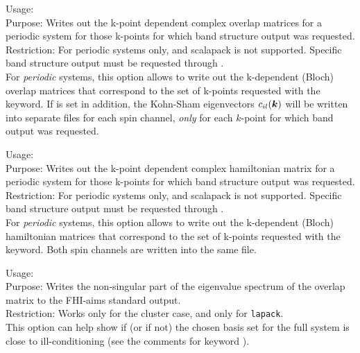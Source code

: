 {
  \noindent
  Usage:   \\[1.0ex]
  Purpose: Writes out the k-point dependent complex overlap matrices 
    for a periodic system for those k-points for which band structure 
    output was requested. \\[1.0ex]
  Restriction: For periodic systems only, and scalapack is not
  supported. Specific band structure output must be requested through 
   . \\[1.0ex]
}
For \emph{periodic} systems, this option allows to write out the
k-dependent (Bloch) overlap matrices that correspond to the set of
k-points requested with the  
keyword. If   is set in
addition, the Kohn-Sham eigenvectors $c_{il}(\mbox{\boldmath$k$})$ will be
written into separate files for each spin channel, \emph{only} for each
$k$-point for which band output was requested.

{
  \noindent
  Usage:   \\[1.0ex]
  Purpose: Writes out the k-point dependent complex hamiltonian matrix
    for a periodic system for those k-points for which band structure 
    output was requested. \\[1.0ex]
  Restriction: For periodic systems only, and scalapack is not
  supported. Specific band structure output must be requested through 
   . \\[1.0ex]
}
For \emph{periodic} systems, this option allows to write out the
k-dependent (Bloch) hamiltonian matrices that correspond to the set of
k-points requested with the  
keyword. Both spin channels are written into the same file.

{
  \noindent
  Usage:   \\[1.0ex]
  Purpose: Writes the non-singular part of the eigenvalue spectrum of
    the overlap matrix to the FHI-aims standard output. \\[1.0ex]
  Restriction: Works only for the cluster case, and only for
     \texttt{lapack}. \\[1.0ex]
}
This option can help show if (or if not) the chosen basis set for the full
system is close to ill-conditioning (see the comments for keyword
).

